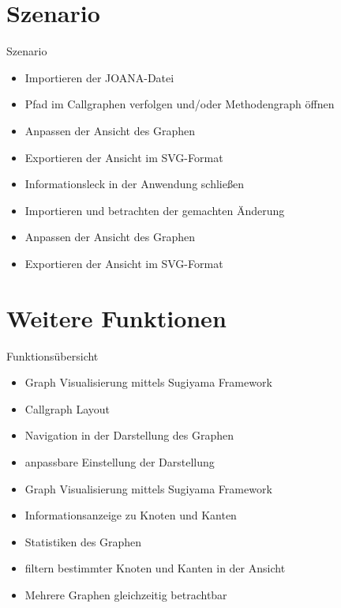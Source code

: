 \documentclass[18pt]{beamer}
\begin{document}
\section{Szenario}
\begin{frame}{Szenario}
\begin{itemize}
	\item Importieren der JOANA-Datei %
	\pause
	\item Pfad im Callgraphen verfolgen und/oder Methodengraph öffnen
	\pause
	\item Anpassen der Ansicht des Graphen %
	\pause
	\item Exportieren der Ansicht im SVG-Format
	\pause
	\item Informationsleck in der Anwendung schließen %
	\pause
	\item Importieren und betrachten der gemachten Änderung %
	\pause
	\item Anpassen der Ansicht des Graphen %
	\pause
	\item Exportieren der Ansicht im SVG-Format
	\pause
\end{itemize}	
\end{frame}

\section{Weitere Funktionen}
\begin{frame}{Funktionsübersicht}
\begin{itemize}
\item Graph Visualisierung mittels Sugiyama Framework
\pause
\item Callgraph Layout
\pause
\item Navigation in der Darstellung des Graphen
\pause
\item anpassbare Einstellung der Darstellung
\pause
\item Graph Visualisierung mittels Sugiyama Framework
\pause
\item Informationsanzeige zu Knoten und Kanten
\pause
\item Statistiken des Graphen
\pause
\item filtern bestimmter Knoten und Kanten in der Ansicht
\pause
\item Mehrere Graphen gleichzeitig betrachtbar
\pause
\end{itemize}
\end{frame}
\end{document}
